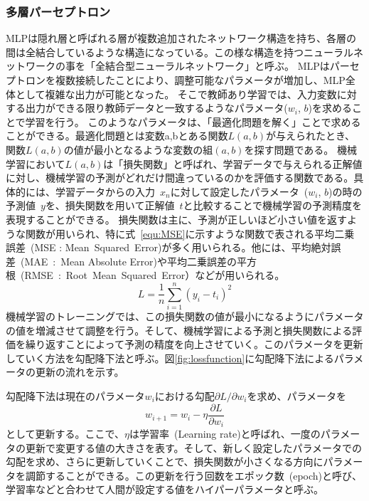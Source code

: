 \subsubsection{多層パーセプトロン}
MLPは隠れ層と呼ばれる層が複数追加されたネットワーク構造を持ち、各層の間は全結合しているような構造になっている。この様な構造を持つニューラルネットワークの事を「全結合型ニューラルネットワーク」と呼ぶ。
MLPはパーセプトロンを複数接続したことにより、調整可能なパラメータが増加し、MLP全体として複雑な出力が可能となった。
そこで教師あり学習では、入力変数に対する出力ができる限り教師データと一致するようなパラメータ($w_i$, $b$)を求めることで学習を行う。
このようなパラメータは、「最適化問題を解く」ことで求めることができる。最適化問題とは変数a,bとある関数$L(a,b)$が与えられたとき、関数$L(a,b)$の値が最小となるような変数の組$(a,b)$を探す問題である。
機械学習において$L(a,b)$は「損失関数」と呼ばれ、学習データで与えられる正解値に対し、機械学習の予測がどれだけ間違っているのかを評価する関数である。具体的には、学習データからの入力~$x_n$に対して設定したパラメータ~($w_i$, $b$)の時の予測値~$y$を、損失関数を用いて正解値~$t$と比較することで機械学習の予測精度を表現することができる。
損失関数は主に、予測が正しいほど小さい値を返すような関数が用いられ、特に式~\eqref{equ:MSE}に示すような関数で表される平均二乗誤差~(MSE : Mean~Squared~Error)が多く用いられる。他には、平均絶対誤差~(MAE~:~Mean Absolute Error)や平均二乗誤差の平方根~(RMSE~:~Root~Mean~Squared~Error）などが用いられる。
\begin{equation}
    L = \frac{1}{n}\sum^{n}_{i=1}(y_i-t_i)^2
    \label{equ:MSE}
\end{equation}
機械学習のトレーニングでは、この損失関数の値が最小になるようにパラメータの値を増減させて調整を行う。そして、機械学習による予測と損失関数による評価を繰り返すことによって予測の精度を向上させていく。このパラメータを更新していく方法を勾配降下法と呼ぶ。図\ref{fig:lossfunction}に勾配降下法によるパラメータの更新の流れを示す。

勾配降下法は現在のパラメータ$w_i$における勾配${\partial L}/{\partial w_i}$を求め、パラメータを
\begin{equation}
    w_{i+1} = w_i - \eta\frac{\partial L}{\partial w_i}
    \label{equ:勾配}
\end{equation}
として更新する。ここで、$\eta$は学習率~(Learning rate)と呼ばれ、一度のパラメータの更新で変更する値の大きさを表す。そして、新しく設定したパラメータでの勾配を求め、さらに更新していくことで、損失関数が小さくなる方向にパラメータを調節することができる。この更新を行う回数をエポック数~(epoch)と呼び、学習率などと合わせて人間が設定する値をハイパーパラメータと呼ぶ。


